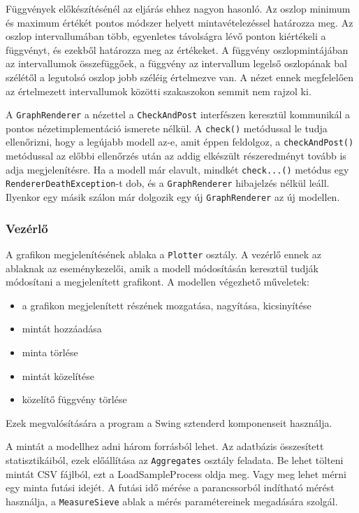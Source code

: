 Függvények előkészítésénél az eljárás ehhez nagyon hasonló.
Az oszlop minimum és maximum értékét pontos módszer helyett mintavételezéssel határozza meg. Az oszlop intervallumában több, egyenletes távolságra lévő ponton kiértékeli a függvényt, és ezekből határozza meg az értékeket.
A függvény oszlopmintájában az intervallumok összefüggőek, a függvény az intervallum legelső oszlopának bal szélétől a legutolsó oszlop jobb széléig értelmezve van.
A nézet ennek megfelelően az értelmezett intervallumok közötti szakaszokon semmit nem rajzol ki.

A \texttt{GraphRenderer} a nézettel a \texttt{CheckAndPost} interfészen keresztül kommunikál a pontos nézetimplementáció ismerete nélkül.
A \texttt{check()} metódussal le tudja ellenőrizni, hogy a legújabb modell az-e, amit éppen feldolgoz, a \texttt{checkAndPost()} metódussal az előbbi ellenőrzés után az addig elkészült részeredményt tovább is adja megjelenítésre.
Ha a modell már elavult, mindkét \texttt{check...()} metódus egy \texttt{RendererDeathException}-t dob, és a \texttt{GraphRenderer} hibajelzés nélkül leáll. Ilyenkor egy másik szálon már dolgozik egy új \texttt{GraphRenderer} az új modellen.

\subsubsection{Vezérlő}

A grafikon megjelenítésének ablaka a \texttt{Plotter} osztály.
A vezérlő ennek az ablaknak az eseménykezelői, amik a modell módosításán keresztül tudják módosítani a megjelenített grafikont.
A modellen végezhető műveletek:
\begin{itemize}
\item a grafikon megjelenített részének mozgatása, nagyítása, kicsinyítése
\item mintát hozzáadása
\item minta törlése
\item mintát közelítése
\item közelítő függvény törlése
\end{itemize}
Ezek megvalósítására a program a Swing sztenderd komponenseit használja.

A mintát a modellhez adni három forrásból lehet.
Az adatbázis összesített statisztikáiból, ezek előállítása az \texttt{Aggregates} osztály feladata.
Be lehet tölteni mintát CSV fájlból, ezt a LoadSampleProcess oldja meg.
Vagy meg lehet mérni egy minta futási idejét.
A futási idő mérése a parancssorból indítható mérést használja, a \texttt{MeasureSieve} ablak a mérés paramétereinek megadására szolgál.

